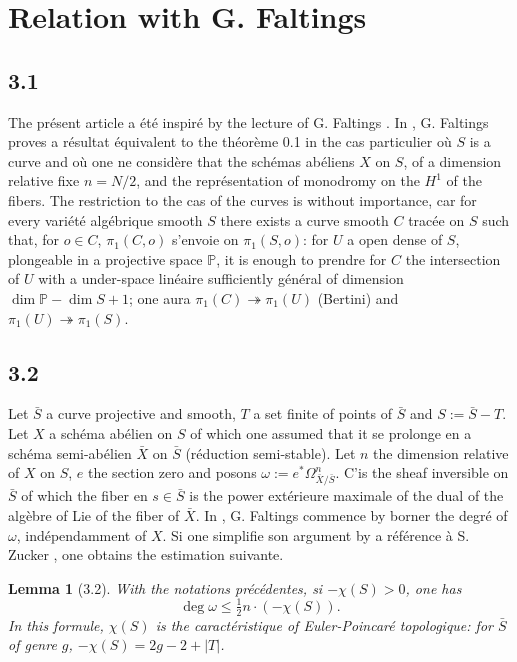 \documentclass[12pt,a4paper]{article}
\theoremstyle{plain}
\newtheorem{lemma}{Lemma}[section]
\theoremstyle{definition}
\newcommand{\PP}{\mathbb{P}}
\begin{document}
{\section{Relation with G. Faltings \cite{Faltings}}

\subsection*{3.1}
The pr\'{e}sent article a \'{e}t\'{e} inspir\'{e} by the lecture of G. Faltings \cite{Faltings}. In \cite{Faltings}, G. Faltings proves a r\'{e}sultat \'{e}quivalent to the th\'{e}or\`{e}me 0.1 in the cas particulier o\`{u} $S$ is a curve and o\`{u} one ne consid\`{e}re that the sch\'{e}mas ab\'{e}liens $X$ on $S$, of a dimension relative fixe $n = N/2$, and the repr\'{e}sentation of monodromy on the $H^{1}$ of the fibers. The restriction to the cas of the curves is without importance, car for every vari\'{e}t\'{e} alg\'{e}brique smooth $S$ there exists a curve smooth $C$ trac\'{e}e on $S$ such that, for $o \in C$, $\pi_{1}(C,o)$ s'envoie on $\pi_{1}(S,o)$: for $U$ a open dense of $S$, plongeable in a projective space $\PP$, it is enough to prendre for $C$ the intersection of $U$ with a under-space lin\'{e}aire sufficiently g\'{e}n\'{e}ral of dimension $\dim \PP - \dim S + 1$; one aura $\pi_{1}(C) \twoheadrightarrow \pi_{1}(U)$ (Bertini) and $\pi_{1}(U) \twoheadrightarrow \pi_{1}(S)$.

\subsection*{3.2}
Let $\bar{S}$ a curve projective and smooth, $T$ a set finite of points of $\bar{S}$ and $S := \bar{S} - T$. Let $X$ a sch\'{e}ma ab\'{e}lien on $S$ of which one assumed that it se prolonge en a sch\'{e}ma semi-ab\'{e}lien $\bar{X}$ on $\bar{S}$ (r\'{e}duction semi-stable). Let $n$ the dimension relative of $X$ on $S$, $e$ the section zero and posons $\omega := e^{*}\Omega^{n}_{\bar{X}/\bar{S}}$. C'is the sheaf inversible on $\bar{S}$ of which the fiber en $s \in \bar{S}$ is the power ext\'{e}rieure maximale of the dual of the alg\`{e}bre of Lie of the fiber of $\bar{X}$. In \cite{Faltings}, G. Faltings commence by borner the degr\'{e} of $\omega$, ind\'{e}pendamment of $X$. Si one simplifie son argument by a r\'{e}f\'{e}rence \`{a} S. Zucker \cite{Zucker}, one obtains the estimation suivante.

\begin{lemma}[3.2]
With the notations pr\'{e}c\'{e}dentes, si $-\chi(S) > 0$, one has
\[
\deg \omega \leq \tfrac{1}{2} n \cdot (-\chi(S)).
\]
In this formule, $\chi(S)$ is the caract\'{e}ristique of Euler-Poincar\'{e} topologique: for $\bar{S}$ of genre $g$, $-\chi(S) = 2g - 2 + |T|$.
\end{lemma}

}
\end{document}
